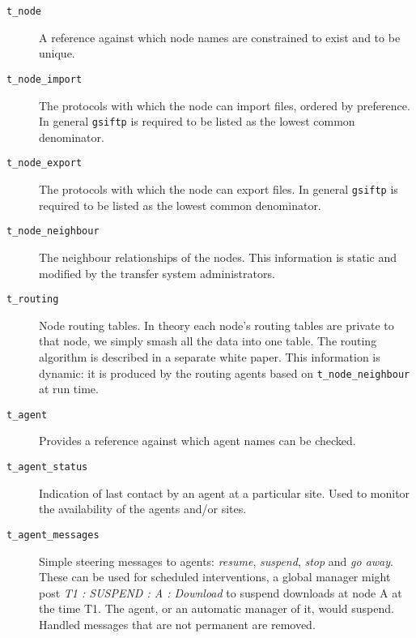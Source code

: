 \documentclass{cmspaper}
\begin{document}
\begin{description}
  \item [\texttt{t\_node}]\mbox{}

    A reference against which node names are constrained to exist
    and to be unique.

  \item [\texttt{t\_node\_import}]\mbox{}
  
    The protocols with which the node can import files, ordered by
    preference.  In general \texttt{gsiftp} is required to be listed
    as the lowest common denominator.
  
  \item [\texttt{t\_node\_export}]\mbox{}
  
    The protocols with which the node can export files.  In general
    \texttt{gsiftp} is required to be listed as the lowest common
    denominator.

  \item [\texttt{t\_node\_neighbour}]\mbox{}

    The neighbour relationships of the nodes.  This information is
    static and modified by the transfer system administrators.

  \item [\texttt{t\_routing}]\mbox{}

    Node routing tables.  In theory each node's routing tables are
    private to that node, we simply smash all the data into one table.
    The routing algorithm is described in a separate white paper.
    This information is dynamic: it is produced by the routing agents
    based on \texttt{t\_node\_neighbour} at run time.

  \item [\texttt{t\_agent}]\mbox{}

    Provides a reference against which agent names can be checked.

  \item [\texttt{t\_agent\_status}]\mbox{}

    Indication of last contact by an agent at a particular site.
    Used to monitor the availability of the agents and/or sites.

  \item [\texttt{t\_agent\_messages}]\mbox{}

    Simple steering messages to agents: {\em resume}, {\em suspend},
    {\em stop} and {\em go away}.  These can be used for scheduled
    interventions, a global manager might post {\em T1 : SUSPEND :
    A : Download } to suspend downloads at node A at the time T1.
    The agent, or an automatic manager of it, would suspend.
    Handled messages that are not permanent are removed.


\end{description}
\end{document}
